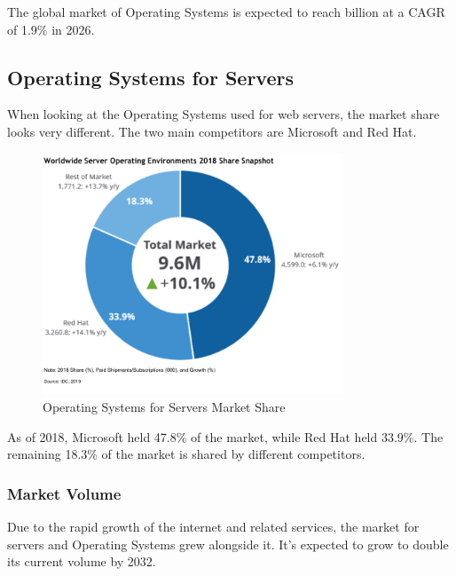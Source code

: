 The global market of Operating Systems is expected to reach  billion at a CAGR of 1.9\% in 2026. 
\cite{OsMarketShare3}

\cite{OsMarketShare}
\cite{OsWikipedia}

\subsection{Operating Systems for Servers}

When looking at the Operating Systems used for web servers, the market share looks very different.
The two main competitors are Microsoft and Red Hat. 

\begin{figure}[H]
    \centering
    \includegraphics[width=0.8\textwidth]{figures/server-operating-system-market-share-2018.png}
    \caption{Operating Systems for Servers Market Share}
    \label{fig:Operating_Systems_for_Servers_Market_Share}
\end{figure}

As of 2018, Microsoft held 47.8\% of the market, while Red Hat held 33.9\%. 
The remaining 18.3\% of the market is shared by different competitors.   

\cite{ServerOsMarketShare}

\subsubsection{Market Volume}

Due to the rapid growth of the internet and related services, the market for servers and Operating Systems grew alongside it. 
It's expected to grow to double its current volume by 2032. 


